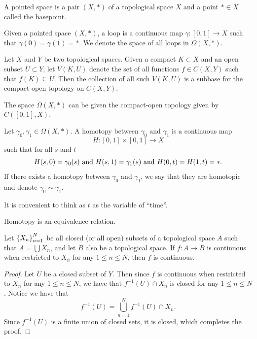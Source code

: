 \documentclass[11pt,a4paper]{article}
\begin{document}
\begin{definition}
  A pointed space is a pair $(X,*)$ of a topological space $X$ and a point
  $* \in X$ called the basepoint.
\end{definition}
\begin{definition}[Loop]
  Given a pointed space $(X,*)$,
  a loop is a continuous map $\gamma \colon [0,1] \to X$ such that
  $\gamma(0) = \gamma(1) = *$.
  We denote the space of all loops in $\Omega(X,*)$.
\end{definition}
\begin{definition}
  Let $X$ and $Y$ be two topological spaces.
  Given a compact $K \subset X$ and an open subset $U \subset Y$,
  let $V(K,U)$ denote the set of all functions $f \in C(X,Y)$ such that
  $f(K) \subseteq U$.
  Then the collection of all such $V(K,U)$ is a subbase for the compact-open
  topology on $C(X,Y)$.
\end{definition}
\begin{remark}
  The space $\Omega(X,*)$ can be given the compact-open topology given
  by $C([0,1], X)$.
\end{remark}

\begin{definition}[Homotopy]
  Let $\gamma_0, \gamma_1 \in \Omega(X,*)$.
  A homotopy between $\gamma_0$ and $\gamma_1$ is a continuous map
  \[
    H \colon [0,1] \times [0,1] \to X
  \]
  such that for all $s$ and $t$
  \[
    H(s,0) = \gamma_0(s) \text{ and }
    H(s,1) = \gamma_1(s) \text{ and }
    H(0,t) = H(1,t) = *.
  \]
  If there exists a homotopy between $\gamma_0$ and $\gamma_1$, we say
  that they are homotopic and denote $\gamma_0 \sim \gamma_1$.
\end{definition}

\begin{remark}
  It is convenient to think as $t$ as the variable of ``time''.
\end{remark}

\begin{lemma}
  \label{lem:homotopy-eq-relation}
  Homotopy is an equivalence relation.
\end{lemma}

\begin{lemma}
  \label{lem:pasting-lemma}
  Let $\left\{X_n\right\}_{n=1}^{N}$ be all closed (or all open) subsets of
  a topological space $A$ such that $A = \bigcup X_n$,
  and let $B$ also be a topological space.
  If $f \colon A \to B$ is continuous when restricted to $X_n$ for any
  $1 \le n \le N$, then $f$ is continuous.
\end{lemma}
\begin{proof}
  Let $U$ be a closed subset of $Y$.
  Then since $f$ is continuous when restricted to $X_n$ for any
  $1 \le n \le N$, we have that $f^{-1}(U) \cap X_n$ is closed for any
  $1 \le n \le N$.
  Notice we have that
  \[
    f^{-1}(U) = \bigcup_{n=1}^{N} f^{-1}(U) \cap X_n.
  \]
  Since $f^{-1}(U)$ is a finite union of closed sets, it is closed,
  which completes the proof.
\end{proof}
\end{document}
